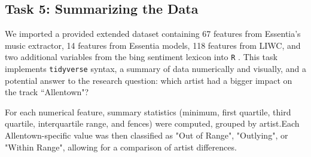 \documentclass{article}\usepackage[]{graphicx}\usepackage[]{xcolor}
\begin{document}
\begin{multicols}{2}

\subsection{Task 5: Summarizing the Data}
We imported a provided extended dataset containing 67 features from Essentia’s music extractor, 14 features from Essentia models, 118 features from LIWC, and two additional variables from the bing sentiment lexicon\citep{HuLiu2004} into \texttt{R} . This task implements \texttt{tidyverse}\citep{tidyverse} syntax, a summary of data numerically and visually, and a potential answer to the research question: which artist had a bigger impact on the track ``Allentown"\citep{Ross}?

For each numerical feature, summary statistics (minimum, first quartile, third quartile, interquartile range, and fences) were computed, grouped by artist.Each Allentown-specific value was then classified as "Out of Range", "Outlying", or "Within Range", allowing for a comparison of artist differences.


\end{multicols}
\end{document}
